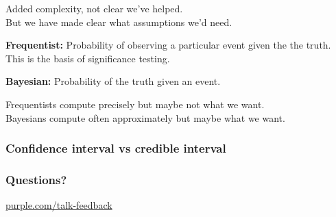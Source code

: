 \begin{frame}
{    Added complexity, not clear we've helped.\\
    But we have made clear what assumptions we'd need.

    \textbf{Frequentist:} Probability of observing a particular event
    given the the truth.\\
    This is the basis of significance testing.

    \textbf{Bayesian:} Probability of the truth given an event.

    Frequentists compute precisely but maybe not what we want.\\
    Bayesians compute often approximately but maybe what we want.

    
  }
\end{frame}

\begin{frame}
  \frametitle{Confidence interval vs credible interval}

  \vspace{1cm}

  \vfill
\end{frame}


\begin{frame}
  \frametitle{Questions?}
  \vspace{3cm}
  \centerline{\large\url{purple.com/talk-feedback}}
\end{frame}


